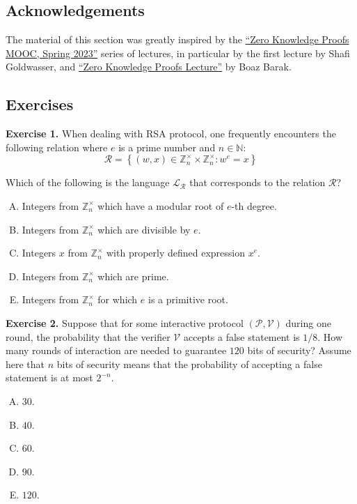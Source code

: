 \documentclass[../lecture-notes-148x210.tex]{subfiles}
\begin{document}
\subsection*{Acknowledgements}

The material of this section was greatly inspired by the
\href{https://rdi.berkeley.edu/zk-learning/}{``Zero Knowledge Proofs MOOC,
Spring 2023''} series of lectures, in particular by the first lecture by Shafi
Goldwasser, and
\href{https://www.cs.princeton.edu/courses/archive/fall07/cos433/lec15.pdf}{``Zero
Knowledge Proofs Lecture''} by Boaz Barak.

\subsection{Exercises}

\textbf{Exercise 1.} When dealing with RSA protocol, one frequently encounters the following relation where $e$ is a prime number and $n \in \mathbb{N}$:
\begin{equation*}
    \mathcal{R} = \left\{ (w, x) \in \mathbb{Z}_n^{\times} \times \mathbb{Z}_n^{\times}: w^e = x \right\}
\end{equation*}

Which of the following is the language $\mathcal{L}_{\mathcal{R}}$ that corresponds to the relation $\mathcal{R}$?
\begin{enumerate}[(A)]
    \item Integers from $\mathbb{Z}_n^{\times}$ which have a modular root of $e$-th degree.
    \item Integers from $\mathbb{Z}_n^{\times}$ which are divisible by $e$.
    \item Integers $x$ from $\mathbb{Z}_n^{\times}$ with properly defined expression $x^e$.
    \item Integers from $\mathbb{Z}_n^{\times}$ which are prime.
    \item Integers from $\mathbb{Z}_n^{\times}$ for which $e$ is a primitive root.
\end{enumerate}

\textbf{Exercise 2.} Suppose that for some interactive protocol $(\mathcal{P}, \mathcal{V})$ during one round, the probability that the verifier $\mathcal{V}$ accepts a false statement is $1/8$. How many rounds of interaction are needed to guarantee $120$ bits of security? Assume here that $n$ bits of security means that the probability of accepting a false statement is at most $2^{-n}$.
\begin{multicols}{5}    
    \begin{enumerate}[(A)]
        \item $30$.
        \item $40$.
        \item $60$.
        \item $90$.
        \item $120$.
    \end{enumerate}
\end{multicols}
\end{document}
